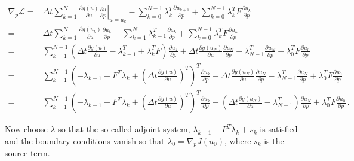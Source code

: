 \documentclass[10pt]{article}
\newcommand{\dt}{\Delta t}
\newcommand{\CostFcn}{J}
\newcommand{\CostIntegrand}{g}
\newcommand{\param}{p}
\newcommand{\ModelTLM}{F}
\newcommand{\Lagrangian}{{\mathcal{L}}}
\begin{document}
\begin{allowdisplaybreaks}
\begin{align}
  \nonumber
  \nabla_\param
  \Lagrangian =&\dt \sum_{k=1}^{N} \left.
  \frac{\partial
  \CostIntegrand(u)}{\partial u}\frac{\partial u}{\partial \param}
  \right|_{u=u_k}
- \sum_{k=0}^{N-1} \lambda_k^T \frac{\partial u_{k+1}}{\partial
  \param}  + \sum_{k=0}^{N-1}
\lambda_k^T \ModelTLM \frac{\partial u_{k}}{\partial \param}
\\
\nonumber
=& \dt\sum_{k=1}^{N}  
\frac{\partial
  \CostIntegrand(u_k)}{\partial u} \frac{\partial u_k}{\partial \param}-
\sum_{k=1}^{N} \lambda_{k-1}^T \frac{\partial u_{k}}{\partial \param}
+ \sum_{k=0}^{N-1} \lambda_k^T \ModelTLM \frac{\partial
  u_{k}}{\partial \param}
\\
\nonumber
=&\sum_{k=1}^{N-1}  \left(  \dt \frac{\partial
  \CostIntegrand(u)}{\partial u}  -  \lambda_{k-1}^T  +  \lambda_k^T
\ModelTLM \right) \frac{\partial u_{k}}{\partial \param} + \dt \frac{\partial
  \CostIntegrand(u_N)}{\partial u} \frac{\partial u_{N}}{\partial
  \param} -  \lambda_{N-1}^T \frac{\partial u_{N}}{\partial \param} +
\lambda_0^T \ModelTLM \frac{\partial   u_{0}}{\partial \param}
\\
\nonumber
=&\sum_{k=1}^{N-1}  \left(    - \lambda_{k-1}   +  \ModelTLM^T
\lambda_k +\left(\dt\frac{\partial
  \CostIntegrand(u)}{\partial u}\right)^T \right)^T \frac{\partial u_{k}}{\partial \param} + \dt \frac{\partial
  \CostIntegrand(u_N)}{\partial u} \frac{\partial u_{N}}{\partial
  \param} -  \lambda_{N-1}^T \frac{\partial u_{N}}{\partial \param} +
\lambda_0^T \ModelTLM \frac{\partial   u_{0}}{\partial \param}
\\
\nonumber
=&\sum_{k=1}^{N-1}  \left(  -   \lambda_{k-1}   +  \ModelTLM^T
\lambda_k + \left(\dt\frac{\partial
  \CostIntegrand(u)}{\partial u}\right)^T \right)^T \frac{\partial
  u_{k}}{\partial \param} + \left(\dt \frac{\partial 
  \CostIntegrand(u_N)}{\partial u}  -  \lambda_{N-1}^T\right)
\frac{\partial u_{N}}{\partial \param} +
\lambda_0^T \ModelTLM \frac{\partial u_{0}}{\partial \param}\,.
\end{align}
\end{allowdisplaybreaks}
%
Now choose $\lambda$ so that the so called adjoint system, $\lambda_{k-1}   -  \ModelTLM^T
\lambda_k + s_k$ is satisfied and the boundary conditions vanish so
that $\lambda_0 = \nabla_\param \CostFcn(u_0)$, where $s_k$ is the
source term.
\end{document}
